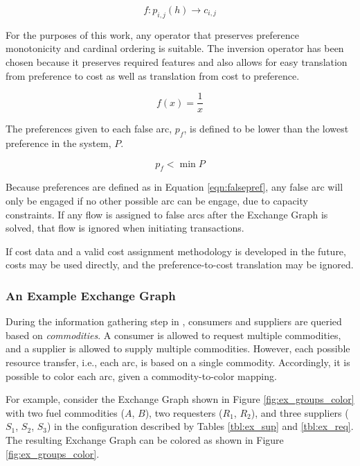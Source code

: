 \begin{equation}
f : p_{i,j}(h) \to c_{i,j}
\end{equation}

\noindent
For the purposes of this work, any operator that preserves preference
monotonicity and cardinal ordering is suitable.  The inversion operator has been
chosen because it preserves required features and also allows for easy
translation from preference to cost as well as translation from cost to
preference.

\begin{equation}
f(x) = \frac{1}{x}
\end{equation}

The preferences given to each false arc, $p_f$, is defined to be lower than the
lowest preference in the system, $P$.

\begin{equation}\label{eqn:falsepref}
  p_{f} < \min P
\end{equation}

Because preferences are defined as in Equation \ref{eqn:falsepref}, any false
arc will only be engaged if no other possible arc can be engage, due to capacity
constraints. If any flow is assigned to false arcs after the Exchange Graph is
solved, that flow is ignored when initiating transactions.

If cost data and a valid cost assignment methodology is developed in the future,
costs may be used directly, and the preference-to-cost translation may be
ignored.

\subsubsection{An Example Exchange Graph}

During the information gathering step in , consumers and
suppliers are queried based on \textit{commodities}. A consumer is allowed to
request multiple commodities, and a supplier is allowed to supply multiple
commodities. However, each possible resource transfer, i.e., each arc, is based
on a single commodity. Accordingly, it is possible to color each arc, given a
commodity-to-color mapping.

For example, consider the Exchange Graph shown in Figure \ref{fig:ex_groups_color}
with two fuel commodities ($A$, $B$), two requesters ($R_1$, $R_2$), and three
suppliers ($S_1$, $S_2$, $S_3$) in the configuration described by Tables
\ref{tbl:ex_sup} and \ref{tbl:ex_req}. The resulting Exchange Graph can be
colored as shown in Figure \ref{fig:ex_groups_color}.

